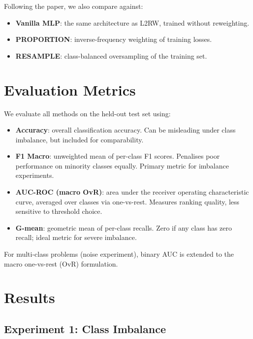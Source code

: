 \documentclass{article}
\begin{document}
Following the paper, we also compare against:
\begin{itemize}
  \item \textbf{Vanilla MLP}: the same architecture as L2RW, trained without reweighting.
  \item \textbf{PROPORTION}: inverse-frequency weighting of training losses.
  \item \textbf{RESAMPLE}: class-balanced oversampling of the training set.
\end{itemize}

\section{Evaluation Metrics}

We evaluate all methods on the held-out test set using:

\begin{itemize}
  \item \textbf{Accuracy}: overall classification accuracy.
    Can be misleading under class imbalance, but included for comparability.

  \item \textbf{F1 Macro}: unweighted mean of per-class F1 scores.
    Penalises poor performance on minority classes equally.
    Primary metric for imbalance experiments.

  \item \textbf{AUC-ROC (macro OvR)}: area under the receiver operating
    characteristic curve, averaged over classes via one-vs-rest.
    Measures ranking quality, less sensitive to threshold choice.

  \item \textbf{G-mean}: geometric mean of per-class recalls.
    Zero if any class has zero recall; ideal metric for severe imbalance.
\end{itemize}

For multi-class problems (noise experiment), binary AUC is extended to
the macro one-vs-rest (OvR) formulation.

\section{Results}

\subsection{Experiment 1: Class Imbalance}
\end{document}
